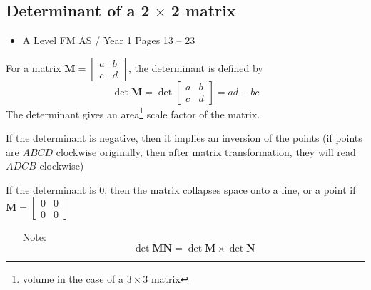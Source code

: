 \documentclass[11pt, a4paper]{article}
\begin{document}
\subsection{Determinant of a 2$\,\times\,$2 matrix}
\begin{itemize}
\item A Level FM AS / Year 1 \hspace{1cm} Pages 13 -- 23
\end{itemize} \par
For a matrix $\boldsymbol{M}=\begin{bmatrix}a&b\\c&d\end{bmatrix}$, the determinant is defined by
\begin{equation*}
\det \boldsymbol{M}=\det\begin{bmatrix}a&b\\c&d\end{bmatrix}=ad-bc
\end{equation*}
The determinant gives an area\footnote{volume in the case of a $3\times3$ matrix} scale factor of the matrix. \newline\par
If the determinant is negative, then it implies an inversion of the points (if points are $ABCD$ clockwise originally, then after matrix transformation, they will read $ADCB$ clockwise) \newline\par
If the determinant is $0$, then the matrix collapses space onto a line, or a point if $\boldsymbol{M}=\begin{bmatrix}0&0\\0&0\end{bmatrix}$
\begin{itemize}
\item[Note:] \begin{equation*}
\det \boldsymbol{MN}=\det \boldsymbol{M}\times\det \boldsymbol{N}
\end{equation*}
\end{itemize}
\vspace{0.5cm}

\newpage
\end{document}
